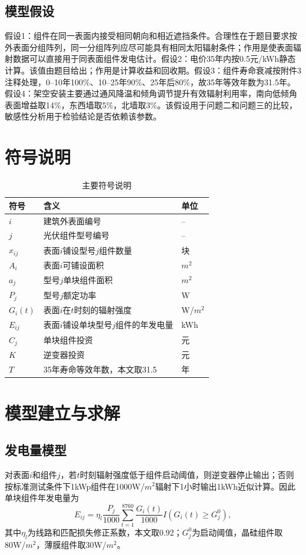 \documentclass[UTF8,a4paper,12pt]{ctexart}
\begin{document}
\subsection{模型假设}
假设1：组件在同一表面内接受相同朝向和相近遮挡条件。合理性在于题目要求按外表面分组阵列，同一分组阵列应尽可能具有相同太阳辐射条件；作用是使表面辐射数据可以直接用于同表面组件发电估计。假设2：电价35年内按0.5元/kWh静态计算。该值由题目给出；作用是计算收益和回收期。假设3：组件寿命衰减按附件3注释处理，0--10年100\%、10--25年90\%、25年后80\%，故35年等效年数为31.5年。假设4：架空安装主要通过通风降温和倾角调节提升有效辐射利用率，南向低倾角表面增益取14\%，东西墙取5\%，北墙取3\%。该假设用于问题二和问题三的比较，敏感性分析用于检验结论是否依赖该参数。

\section{符号说明}
\begin{table}[H]\centering\caption{主要符号说明}
\begin{tabular}{lll}\toprule
符号 & 含义 & 单位\\\midrule
$i$ & 建筑外表面编号 & --\\
$j$ & 光伏组件型号编号 & --\\
$x_{ij}$ & 表面$i$铺设型号$j$组件数量 & 块\\
$A_i$ & 表面$i$可铺设面积 & $m^2$\\
$a_j$ & 型号$j$单块组件面积 & $m^2$\\
$P_j$ & 型号$j$额定功率 & W\\
$G_i(t)$ & 表面$i$在$t$时刻的辐射强度 & W/$m^2$\\
$E_{ij}$ & 表面$i$铺设单块型号$j$组件的年发电量 & kWh\\
$C_j$ & 单块组件投资 & 元\\
$K$ & 逆变器投资 & 元\\
$T$ & 35年寿命等效年数，本文取31.5 & 年\\
\bottomrule\end{tabular}\end{table}

\section{模型建立与求解}
\subsection{发电量模型}
对表面$i$和组件$j$，若$t$时刻辐射强度低于组件启动阈值，则逆变器停止输出；否则按标准测试条件下1kWp组件在1000W/$m^2$辐射下1小时输出1kWh近似计算。因此单块组件年发电量为
\begin{equation}
E_{ij}=\eta_l\frac{P_j}{1000}\sum_{t=1}^{8760} \frac{G_i(t)}{1000} I(G_i(t)\geq G_j^0),
\end{equation}
其中$\eta_l$为线路和匹配损失修正系数，本文取0.92；$G_j^0$为启动阈值，晶硅组件取80W/$m^2$，薄膜组件取30W/$m^2$。
\end{document}
